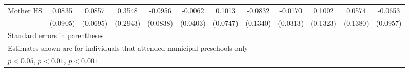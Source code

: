 \begin{table}[htbp]
\begin{tabular}{l*{11}{c}}
\addlinespace
Mother HS   &      0.0835         &      0.0857         &      0.3548         &     -0.0956         &     -0.0062         &      0.1013         &     -0.0832         &     -0.0170         &      0.1002         &      0.0574         &     -0.0653         \\
            &    (0.0905)         &    (0.0695)         &    (0.2943)         &    (0.0838)         &    (0.0403)         &    (0.0747)         &    (0.1340)         &    (0.0313)         &    (0.1323)         &    (0.1380)         &    (0.0957)         \\
\bottomrule
\multicolumn{12}{l}{\footnotesize Standard errors in parentheses}\\
\multicolumn{12}{l}{\footnotesize Estimates shown are for individuals that attended municipal preschools only}\\
\multicolumn{12}{l}{\footnotesize \sym{*} \(p<0.05\), \sym{**} \(p<0.01\), \sym{***} \(p<0.001\)}\\
\end{tabular}
\end{table}
